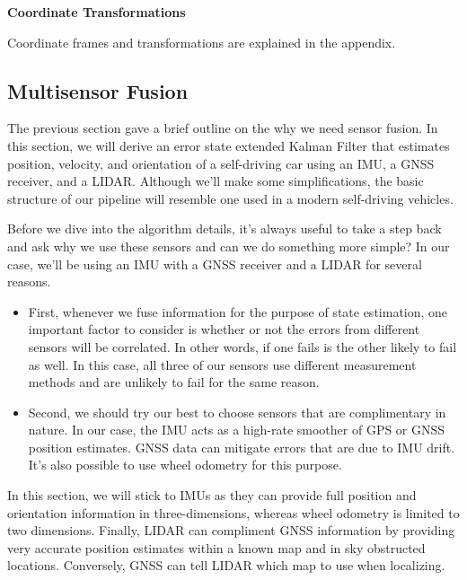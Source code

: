 \begin{framed}
\theoremstyle{remark}
\begin{remark}{\textbf{Coordinate Transformations}}

Coordinate frames and transformations are explained in the appendix.
\end{remark}
\end{framed}


\subsection{Multisensor Fusion}
\label{multisensor_fusion}

The previous section gave a brief outline on the why we need sensor fusion.  In this section,
we will derive an error state extended Kalman Filter that
estimates position, velocity, and orientation of
a self-driving car using an IMU, a GNSS receiver,
and a LIDAR. Although we'll make some simplifications, the basic structure
of our pipeline will resemble one used in a modern self-driving vehicles. 

Before we dive into
the algorithm details, it's always useful to take a step back and ask why we use these sensors and can we do something
more simple? In our case, we'll be using an IMU with a GNSS receiver and a LIDAR for several reasons. 

\begin{itemize}
\item First, whenever we fuse information for the purpose of state estimation, one important factor
to consider is whether or not the errors from different sensors will be correlated. In other words,
if one fails is the other likely to fail as well. In this case, all three of our sensors use different measurement
methods and are unlikely to fail for the same reason. 
\item Second, we should try our best to choose sensors that are complimentary in nature. In our case, the IMU acts as a high-rate
smoother of GPS or GNSS position estimates. GNSS data can mitigate errors that are due to IMU drift. It's also possible to use wheel odometry for this purpose. 
\end{itemize}

In this section, we will stick to IMUs as they can provide full position
and orientation information in three-dimensions, whereas wheel odometry is limited to two dimensions. Finally, LIDAR
can compliment GNSS information by providing very accurate position estimates within a known map and in sky obstructed locations. 
Conversely, GNSS can tell LIDAR which map to use when localizing. 

